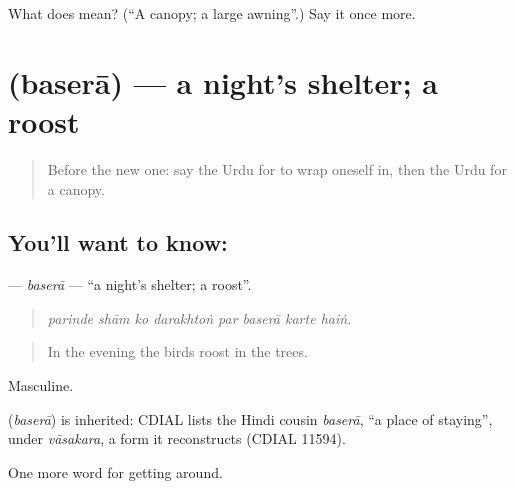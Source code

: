 \begin{tcolorbox}[breakable,colback=teal!4,colframe=teal!35!black,title={Before you move on}]
What does  mean? (\textquotedblleft{}A canopy; a large awning\textquotedblright{}.) Say it once more.
\end{tcolorbox}
\section[\texorpdfstring{\ur{بسیرا} (baserā)}{بسیرا (baserā)}]{ (baserā) — a night's shelter; a roost}

\label{lesson:UR-C406-basera}



\begin{quote}
Before the new one: say the Urdu for to wrap oneself in, then the Urdu for a canopy.
\end{quote}

\subsection*{You'll want to know: }
\textbf{} — \emph{baserā} — \textquotedblleft{}a night's shelter; a roost\textquotedblright{}.

\begin{quote}
       
\end{quote}

\begin{quote}
\emph{parinde shām ko darakhtoṅ par baserā karte haiṅ.}
\end{quote}

\begin{quote}
In the evening the birds roost in the trees.
\end{quote}

Masculine.

\begin{cousinweb}
\textbf{} (\emph{baserā}) is inherited: CDIAL lists the Hindi cousin \emph{baserā}, \textquotedblleft{}a place of staying\textquotedblright{}, under \emph{vāsakara}, a form it reconstructs (CDIAL 11594).
\end{cousinweb}

\begin{grammarlens}[title={What you've built}]
One more word for getting around.
\end{grammarlens}

